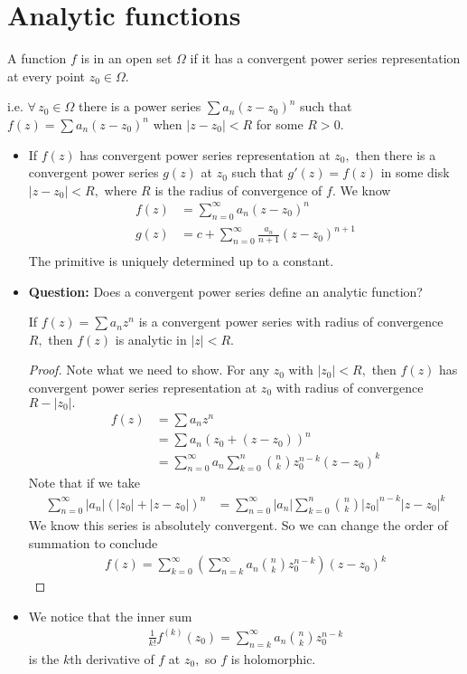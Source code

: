 \documentclass[a4paper,12pt]{article}
\begin{document}
\section{Analytic functions}
\begin{definition}
    A function $f$ is  in an open set $\Omega$ if it has a convergent power series representation at every point $z_0\in\Omega.$

    i.e. $\forall\,z_0\in\Omega$ there is a power series $\sum a_n(z-z_0)^n$ such that $f(z)=\sum a_n(z-z_0)^n$ when $|z-z_0|<R$ for some $R>0.$
\end{definition}
\begin{itemize}
    \item If $f(z)$ has convergent power series representation at $z_0,$ then there is a convergent power series $g(z)$ at $z_0$ such that $g'(z)=f(z)$ in some disk $|z-z_0|<R,$ where $R$ is the radius of convergence of $f.$ We know \begin{align}
        f(z)&=\sum_{n=0}^\infty a_n(z-z_0)^n\\
        g(z)&=c+\sum_{n=0}^\infty\frac{a_n}{n+1}(z-z_0)^{n+1}\\
    \end{align}
    The primitive is uniquely determined up to a constant.
    \item \textbf{Question:} Does a convergent power series define an analytic function?
    \begin{proposition}
        If $f(z)=\sum a_nz^n$ is a convergent power series with radius of convergence $R,$ then $f(z)$ is analytic in $|z|<R.$
        \begin{proof}
            Note what we need to show. For any $z_0$ with $|z_0|<R,$ then $f(z)$ has convergent power series representation at $z_0$ with radius of convergence $R-|z_0|.$\begin{align}
                f(z)&=\sum a_nz^n\\
                &=\sum a_n(z_0+(z-z_0))^n\\
                &=\sum_{n=0}^\infty a_n\sum_{k=0}^n\binom{n}{k}z_0^{n-k}(z-z_0)^k
            \end{align}
            Note that if we take \begin{align}
                \sum_{n=0}^\infty|a_n|\left(|z_0|+|z-z_0|\right)^n&=\sum_{n=0}^\infty|a_n|\sum_{k=0}^n\binom{n}{k}|z_0|^{n-k}|z-z_0|^k
            \end{align}
            We know this series is absolutely convergent. So we can change the order of summation  to conclude \begin{align}
                f(z)=\sum_{k=0}^\infty\left(\sum_{n=k}^\infty a_n\binom{n}{k}z_0^{n-k}\right)(z-z_0)^k
            \end{align}
        \end{proof}
    \end{proposition}
    \item We notice that the inner sum\begin{align}
        \frac{1}{k!}f^{(k)}(z_0)=\sum_{n=k}^\infty a_n\binom{n}{k}z_0^{n-k}
    \end{align} is the $k$th derivative of $f$ at $z_0,$ so $f$ is holomorphic.
\end{itemize}
\end{document}
